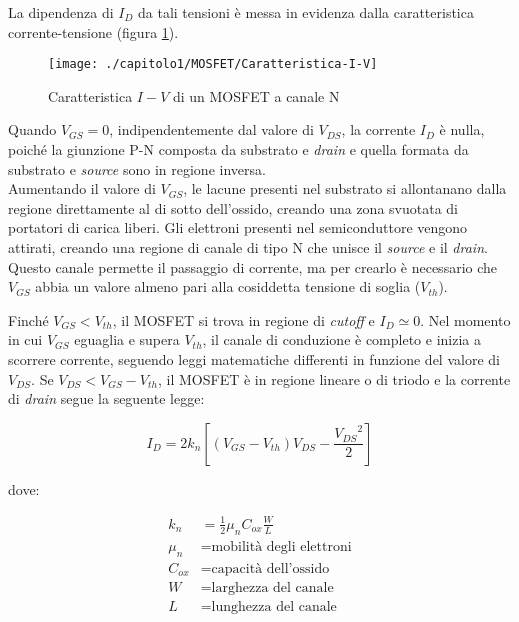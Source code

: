 La dipendenza di $I_D$ da tali tensioni è messa in evidenza dalla caratteristica corrente-tensione (figura \ref{fig:caratteristica-I-V}).

\begin{figure}[h]
  \centering
  \texttt{[image: ./capitolo1/MOSFET/Caratteristica-I-V]}
  \caption[Caratteristica $I-V$ di un MOSFET a canale N]{Caratteristica $I-V$ di un MOSFET a canale N}
  \label{fig:caratteristica-I-V}
\end{figure}

Quando $V_{GS} = 0$, indipendentemente dal valore di $V_{DS}$, la corrente $I_D$ è nulla, poiché la giunzione P-N composta da substrato e \emph{drain} e quella formata da substrato e \emph{source} sono in regione inversa. \\
Aumentando il valore di $V_{GS}$, le lacune presenti nel substrato si allontanano dalla regione direttamente al di sotto dell'ossido, creando una
zona svuotata di portatori di carica liberi. Gli elettroni presenti nel semiconduttore
vengono attirati, creando una regione di canale di tipo N che unisce il
\emph{source} e il \emph{drain}. Questo canale permette il passaggio di corrente, ma per crearlo è necessario che $V_{GS}$ abbia un valore almeno pari alla cosiddetta tensione di soglia ($V_{th}$). 

Finché $V_{GS} < V_{th}$, il MOSFET si trova in regione di \emph{cutoff} e $I_D \simeq 0$.
Nel momento in cui $V_{GS}$ eguaglia e supera $V_{th}$, il canale di conduzione è completo e inizia a scorrere corrente, seguendo leggi matematiche differenti in funzione del valore di $V_{DS}$.
Se $V_{DS} < V_{GS} -  V_{th}$, il MOSFET è in regione lineare o di triodo e la corrente di \emph{drain} segue la seguente legge:

\begin{equation}
  I_D = 2k_n\left[ \left(V_{GS}-V_{th}\right)V_{DS} - \frac{{V_{DS}}^2}{2}\right]
\end{equation}

dove:

\begin{align*}
   k_n &= \frac{1}{2}\mu_n C_{ox}\frac{W}{L} \\
   \mu_n &= \text{mobilità degli elettroni} \\
   C_{ox} &= \text{capacità dell'ossido} \\
   W &= \text{larghezza del canale} \\
   L &= \text{lunghezza del canale}
\end{align*}

